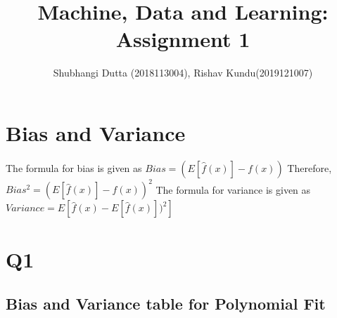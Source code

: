 \documentclass{article}
\begin{document}
\title{Machine, Data and Learning: Assignment 1}
\author{Shubhangi Dutta (2018113004), Rishav Kundu(2019121007)}
\maketitle
\newpage
\section{Bias and Variance}
The formula for bias is given as 
\newline
$Bias=(E[\hat{f}(x)]-f(x))$
\newline 
Therefore, 
\newline
$Bias^2=(E[\hat{f}(x)]-f(x))^2$
\newline
The formula for variance is given as 
\newline
$Variance=E[\hat{f}(x)-E[\hat{f}(x)])^2]$
\section{Q1}
\subsection{Bias and Variance table for Polynomial Fit}
\end{document}
